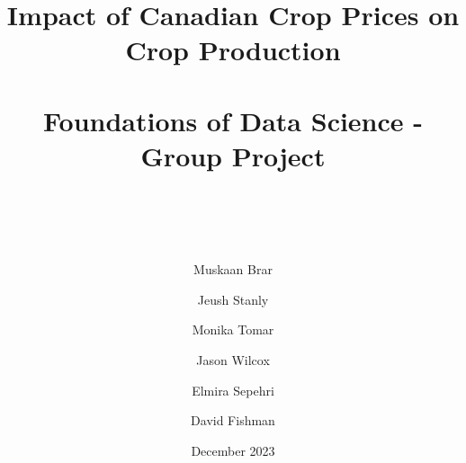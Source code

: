 \title{
    Impact of Canadian Crop Prices on Crop Production \\~\\
    \large Foundations of Data Science - Group Project  \\~\\~\\
}


\date{December 2023}

\author[1]{Muskaan Brar}
\author[2]{Jeush Stanly}
\author[3]{Monika Tomar}
\author[4]{Jason Wilcox}
\author[5]{Elmira Sepehri}
\author[6]{David Fishman}

{
    \makeatletter
    \renewcommand\AB@affilsepx{: \protect\Affilfont}
    \makeatother


    \makeatletter
    \renewcommand\AB@affilsepx{, \protect\Affilfont}
    \makeatother

}

\maketitle
